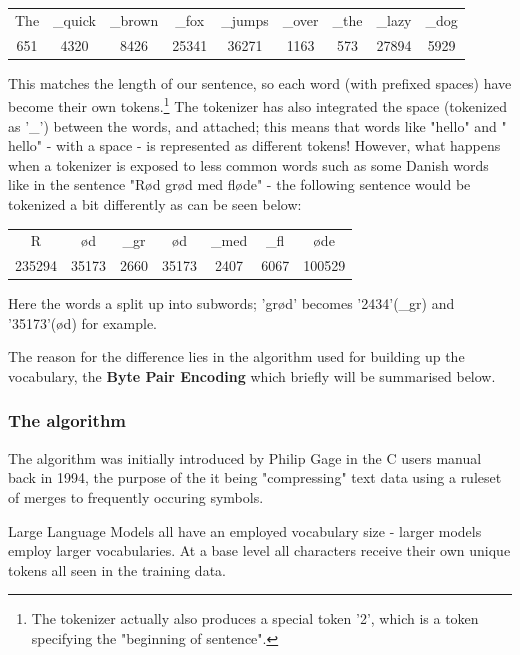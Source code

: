 \begin{center}
    \begin{tabular}{c c c c c c c c c}
        The & \_quick & \_brown & \_fox & \_jumps & \_over & \_the & \_lazy & \_dog \\
        651 & 4320 & 8426 & 25341 & 36271 & 1163 & 573 & 27894 & 5929 \\
    \end{tabular}
\end{center}
This matches the length of our sentence, so each word (with prefixed spaces) have become their own tokens.\footnote{The tokenizer actually also produces a special token '2', which is a token specifying the "beginning of sentence".}  The tokenizer has also integrated the space (tokenized as '\_') between the words, and attached; this means that words like "hello" and " hello" - with a space - is represented as different tokens! However, what happens when a tokenizer is exposed to less common words such as some Danish words like in the sentence "Rød grød med fløde" - the following sentence would be tokenized a bit differently as can be seen below:

\begin{center}
    \begin{tabular}{c c c c c c c}
        R & ød & \_gr & ød & \_med & \_fl & øde \\
        235294 & 35173 & 2660 & 35173 & 2407 & 6067 & 100529 \\
    \end{tabular}
\end{center}

Here the words a split up  into subwords; 'grød' becomes '2434'(\_gr) and '35173'(ød) for example.

The reason for the difference lies in the algorithm used for building up the vocabulary, the \textbf{Byte Pair Encoding} which briefly will be summarised below.

\subsubsection{The algorithm}

The algorithm was initially introduced by Philip Gage in the C users manual back in 1994, the purpose of the it being "compressing" text data using a ruleset of merges to frequently occuring symbols.\cite{sennrich-etal-2016-neural}

Large Language Models all have an employed vocabulary size - larger models employ larger vocabularies. At a base level all characters receive their own unique tokens all seen in the training data.


